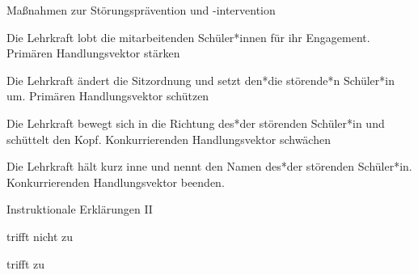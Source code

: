 \begin{mapping}{Maßnahmen zur Störungsprävention und -intervention}
    \begin{answer}
        Die Lehrkraft lobt die mitarbeitenden Schüler*innen für ihr Engagement.
        \ismappedto
        Primären Handlungsvektor stärken
    \end{answer}
    \begin{answer}
        Die Lehrkraft ändert die Sitzordnung und setzt den*die störende*n Schüler*in um.
        \ismappedto
        Primären Handlungsvektor schützen
    \end{answer}
    \begin{answer}
        Die Lehrkraft bewegt sich in die Richtung des*der störenden Schüler*in und schüttelt den Kopf.
        \ismappedto
        Konkurrierenden Handlungsvektor schwächen
    \end{answer}
    \begin{answer}
        Die Lehrkraft hält kurz inne und nennt den Namen des*der störenden Schüler*in.
        \ismappedto
        Konkurrierenden Handlungsvektor beenden.
    \end{answer}
\end{mapping}

\begin{single-choice}{Instruktionale Erklärungen II}
    \begin{answers}
        \item[\correct] trifft nicht zu
        \item[\wrong] trifft zu
    \end{answers}
\end{single-choice}

